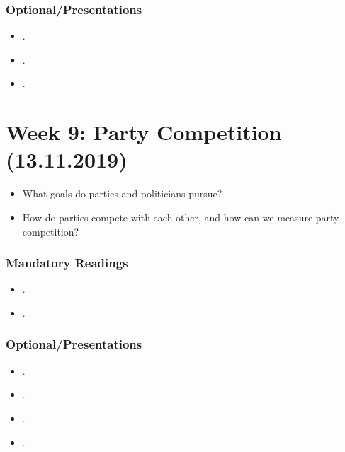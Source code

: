 \documentclass[abstract=on,parskip=full,headings=standardclasses,fontsize=11pt,paper=a4]{scrartcl}
\begin{document}
\subsubsection*{Optional/Presentations}
\begin{itemize}
\item {}.
\item {}.
\item {}.
\end{itemize}


\section{Week 9:  Party Competition (13.11.2019)}

\begin{itemize}
\renewcommand\labelitemi{--}
\item What goals do parties and politicians pursue?
\item How do parties compete with each other, and how can we measure party competition?
\end{itemize}

\subsubsection*{Mandatory Readings}
\begin{itemize}
\item {}.
\item {}.
\end{itemize}

\subsubsection*{Optional/Presentations}
\begin{itemize}
\item {}.
\item {}.
\item {}.
\item {}.
\end{itemize}
\end{document}
